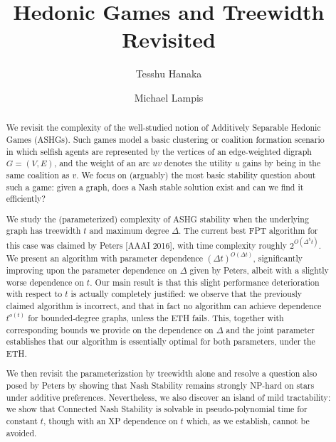 \documentclass[letterpaper,USenglish,cleveref, autoref, thm-restate]{lipics-v2021}
\title{Hedonic Games and Treewidth Revisited}
\author{Tesshu Hanaka}{Department of Mathematical Informatics, Graduate School of Informatics, Nagoya University}{hanaka@i.nagoya-u.ac.jp}{https://orcid.org/0000-0001-6943-856X}{}
\author{Michael Lampis}
{Université Paris-Dauphine, PSL University, CNRS,
LAMSADE, 75016, Paris,
France}{michail.lampis@lamsade.dauphine.fr}{https://orcid.org/0000-0002-5791-0887}{}
\begin{document}
\maketitle

\begin{abstract}

We revisit the complexity of the well-studied notion of Additively Separable
Hedonic Games (ASHGs). Such games model a basic clustering or coalition
formation scenario in which selfish agents are represented by the vertices of
an edge-weighted digraph $G=(V,E)$, and the weight of an arc $uv$ denotes the
utility $u$ gains by being in the same coalition as $v$.  We focus on
(arguably) the most basic stability question about such a game: given a graph,
does a Nash stable solution exist and can we find it efficiently?

We study the (parameterized) complexity of ASHG stability when the
underlying graph has treewidth $t$ and maximum degree $\Delta$. The current
best FPT algorithm for this case was claimed by Peters [AAAI 2016], with time
complexity roughly $2^{O(\Delta^5t)}$. We present an algorithm with parameter
dependence $(\Delta t)^{O(\Delta t)}$, significantly improving upon the
parameter dependence on $\Delta$ given by Peters, albeit with a slightly worse
dependence on $t$. Our main result is that this slight performance
deterioration with respect to $t$ is actually completely justified: we observe
that the previously claimed algorithm is incorrect, and that in fact no
algorithm can achieve dependence $t^{o(t)}$ for bounded-degree graphs, unless
the ETH fails.  This, together with corresponding bounds we provide on the
dependence on $\Delta$ and the joint parameter establishes that our algorithm
is essentially optimal for both parameters, under the ETH.

 

We then revisit the parameterization by treewidth alone and resolve a question
also posed by Peters by showing that Nash Stability remains strongly NP-hard on
stars under additive preferences.  Nevertheless, we also discover an island of
mild tractability: we show that Connected Nash Stability is solvable in
pseudo-polynomial time for constant $t$, though with an XP dependence on $t$
which, as we establish, cannot be avoided.

\end{abstract}
\end{document}
